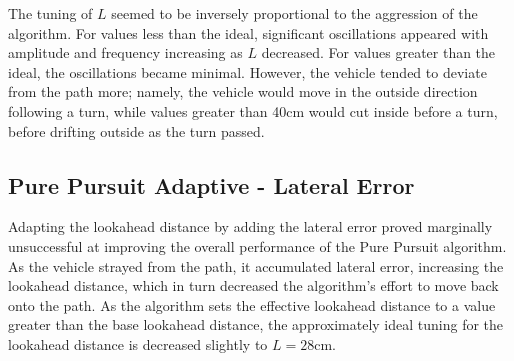 \documentclass[mla8alt]{mla}
\begin{document}
\begin{paper}
\begin{figure}[H]
\endminipage
\end{figure}

The tuning of $L$ seemed to be inversely proportional to the aggression of the algorithm. For values less than the ideal, significant oscillations appeared with amplitude and frequency increasing as $L$ decreased. For values greater than the ideal, the oscillations became minimal. However, the vehicle tended to deviate from the path more; namely, the vehicle would move in the outside direction following a turn, while values greater than 40cm would cut inside before a turn, before drifting outside as the turn passed.

\subsection{Pure Pursuit Adaptive - Lateral Error}

Adapting the lookahead distance by adding the lateral error proved marginally unsuccessful at improving the overall performance of the Pure Pursuit algorithm. As the vehicle strayed from the path, it accumulated lateral error, increasing the lookahead distance, which in turn decreased the algorithm's effort to move back onto the path. As the algorithm sets the effective lookahead distance to a value greater than the base lookahead distance, the approximately ideal tuning for the lookahead distance is decreased slightly to $L=28$cm.


\end{paper}
\end{document}
